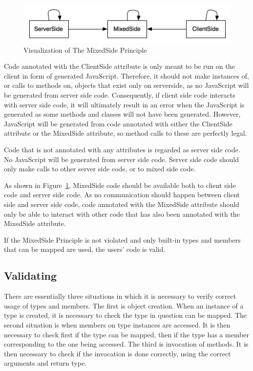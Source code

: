 		\begin{figure}[H]
			\begin{center}
				\centerline{\includegraphics[width=12cm]{resources/images/MixedSidePrinciple.png}}
			\end{center}
			\caption{Visualization of The MixedSide Principle}
			\label{fig:MixedSidePrinciple}
		\end{figure}

		Code annotated with the ClientSide attribute is only meant to be run on the client in form of generated JavaScript. Therefore, it should not make instances of, or calls to methods on, objects that exist only on serverside, as no JavaScript will be generated from server side code. Consequently, if client side code interacts with server side code, it will ultimately result in an error when the JavaScript is generated as some methods and classes will not have been generated. However, JavaScript will be generated from code annotated with either the ClientSide attribute or the MixedSide attribute, so method calls to these are perfectly legal.

		Code that is not annotated with any attributes is regarded as server side code. No JavaScript will be generated from server side code. Server side code should only make calls to other server side code, or to mixed side code.

		As shown in Figure~\ref{fig:MixedSidePrinciple}, MixedSide code should be available both to client side code and server side code. As no communication should happen between client side and server side code, code annotated with the MixedSide attribute should only be able to interact with other code that has also been annotated with the MixedSide attribute. 

		If the MixedSide Principle is not violated and only built-in types and members that can be mapped are used, the users’ code is valid.


	\subsection{Validating} %
	\label{sub:validating}

		There are essentially three situations in which it is necessary to verify correct usage of types and members. The first is object creation. When an instance of a type is created, it is necessary to check the type in question can be mapped. The second situation is when members on type instances are accessed. It is then necessary to check first if the type can be mapped, then if the type has a member corresponding to the one being accessed. The third is invocation of methods. It is then necessary to check if the invocation is done correctly, using the correct arguments and return type.

